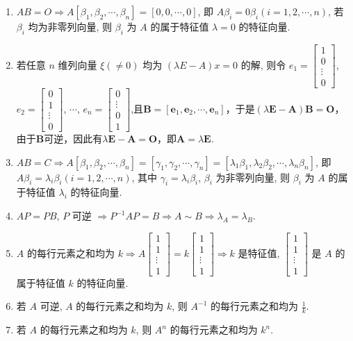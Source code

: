 \begin{enumerate}
    \item $AB=O \Rightarrow A[\beta_1, \beta_2, \cdots, \beta_n] = [0, 0, \cdots, 0]$, 即 $A\beta_i = 0\beta_i (i=1, 2, \cdots, n)$, 若 $\beta_i$ 均为非零列向量, 则 $\beta_i$ 为 $A$ 的属于特征值 $\lambda=0$ 的特征向量.
    \item 若任意 $n$ 维列向量 $\xi (\neq 0)$ 均为 $(\lambda E - A)x = 0$ 的解, 则令 $e_1 = \begin{bmatrix} 1 \\ 0 \\ \vdots \\ 0 \end{bmatrix}$, $e_2 = \begin{bmatrix} 0 \\ 1 \\ \vdots \\ 0 \end{bmatrix}$, $\cdots$, $e_n = \begin{bmatrix} 0 \\ \vdots \\ 0 \\ 1 \end{bmatrix}$,且$\boldsymbol{B}=[\boldsymbol{e}_{1},\boldsymbol{e}_{2},\cdots,\boldsymbol{e}_{n}]$，于是$(\lambda\boldsymbol{E}-\boldsymbol{A})\boldsymbol{B}=\boldsymbol{O}$，由于$\boldsymbol{B}$可逆，因此有$\lambda\boldsymbol{E}-\boldsymbol{A}=\boldsymbol{O}$，即$\boldsymbol{A}=\lambda\boldsymbol{E}$.
    \item $AB = C \Rightarrow A[\beta_1, \beta_2, \cdots, \beta_n] = [\gamma_1, \gamma_2, \cdots, \gamma_n] = [\lambda_1\beta_1, \lambda_2\beta_2, \cdots, \lambda_n\beta_n]$, 即 $A\beta_i = \lambda_i\beta_i (i=1, 2, \cdots, n)$, 其中 $\gamma_i = \lambda_i\beta_i$, $\beta_i$ 为非零列向量, 则 $\beta_i$ 为 $A$ 的属于特征值 $\lambda_i$ 的特征向量.
    \item  $AP = PB$, $P$ 可逆 $\Rightarrow P^{-1}AP = B \Rightarrow A \sim B \Rightarrow \lambda_A = \lambda_B$.
    \item $A$ 的每行元素之和均为 $k \Rightarrow A\begin{bmatrix} 1 \\ 1 \\ \vdots \\ 1 \end{bmatrix} = k\begin{bmatrix} 1 \\ 1 \\ \vdots \\ 1 \end{bmatrix}\Rightarrow k$ 是特征值, $\begin{bmatrix} 1 \\ 1 \\ \vdots \\ 1 \end{bmatrix}$ 是 $A$ 的属于特征值 $k$ 的特征向量.
    \item 若 $A$ 可逆, $A$ 的每行元素之和均为 $k$, 则 $A^{-1}$ 的每行元素之和均为 $\frac{1}{k}$.
    \item 若 $A$ 的每行元素之和均为 $k$, 则 $A^n$ 的每行元素之和均为 $k^n$.
\end{enumerate}